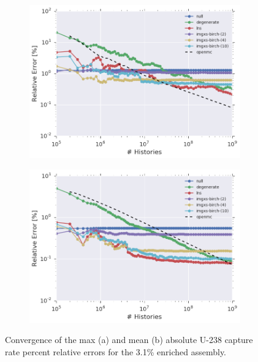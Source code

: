 \begin{figure}[h!]
\centering
\begin{subfigure}{\textwidth}
  \centering
  \includegraphics[width=0.9\linewidth]{figures/results/convergence/assm-31/max-capt-err-evo}
  \caption{}
  \label{fig:chap11-assm-3.1-capture-converge-max}
\end{subfigure}
\begin{subfigure}{\textwidth}
  \centering
  \includegraphics[width=0.9\linewidth]{figures/results/convergence/assm-31/mean-capt-err-evo}
  \caption{}
  \label{fig:chap11-assm-3.1-capture-converge-mean}
\end{subfigure}
\vspace{2mm}
\caption[U-238 capture rate error convergence with MC histories]{Convergence of the max (a) and mean (b) absolute U-238 capture rate percent relative errors for the 3.1\% enriched assembly.}
\label{fig:chap11-assm-3.1-capture-converge}
\end{figure}

